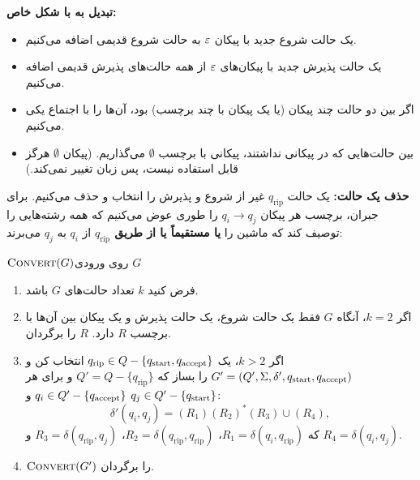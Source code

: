 \textbf{تبدیل  به  با شکل خاص:}
\begin{itemize}
\item یک حالت شروع جدید با پیکان $\varepsilon$ به حالت شروع قدیمی اضافه می‌کنیم.
\item یک حالت پذیرش جدید با پیکان‌های $\varepsilon$ از همه حالت‌های پذیرش قدیمی اضافه می‌کنیم.
\item اگر بین دو حالت چند پیکان (یا یک پیکان با چند برچسب) بود، آن‌ها را با اجتماع یکی می‌کنیم.
\item بین حالت‌هایی که در  پیکانی نداشتند، پیکانی با برچسب $\emptyset$ می‌گذاریم. (پیکان $\emptyset$ هرگز قابل استفاده نیست، پس زبان تغییر نمی‌کند.)
\end{itemize}

\textbf{حذف یک حالت:} یک حالت $q_{\mathrm{rip}}$ غیر از شروع و پذیرش را انتخاب و حذف می‌کنیم. برای جبران، برچسب هر پیکان $q_i\to q_j$ را طوری عوض می‌کنیم که همه رشته‌هایی را توصیف کند که ماشین را \textbf{یا مستقیماً یا از طریق $q_{\mathrm{rip}}$} از $q_i$ به $q_j$ می‌برند:
\begin{ltrfig}
\end{ltrfig}

\begin{algo}{$\textsc{Convert}(G)$}{روی ورودی  $G$}
\begin{enumerate}
\item فرض کنید $k$ تعداد حالت‌های $G$ باشد.
\item اگر $k=2$، آنگاه $G$ فقط یک حالت شروع، یک حالت پذیرش و یک پیکان بین آن‌ها با برچسب $R$ دارد. $R$ را برگردان.
\item اگر $k>2$، یک $q_{\mathrm{rip}}\in Q-\{q_{\mathrm{start}},q_{\mathrm{accept}}\}$ انتخاب کن و  $G'=(Q',\Sigma,\delta',q_{\mathrm{start}},q_{\mathrm{accept}})$ را بساز که $Q'=Q-\{q_{\mathrm{rip}}\}$ و برای هر $q_i\in Q'-\{q_{\mathrm{accept}}\}$ و $q_j\in Q'-\{q_{\mathrm{start}}\}$:
\[\delta'(q_i,q_j)=(R_1)(R_2)^*(R_3)\cup(R_4),\]
که $R_1=\delta(q_i,q_{\mathrm{rip}})$، $R_2=\delta(q_{\mathrm{rip}},q_{\mathrm{rip}})$، $R_3=\delta(q_{\mathrm{rip}},q_j)$ و $R_4=\delta(q_i,q_j)$.
\item $\textsc{Convert}(G')$ را برگردان.
\end{enumerate}
\end{algo}

